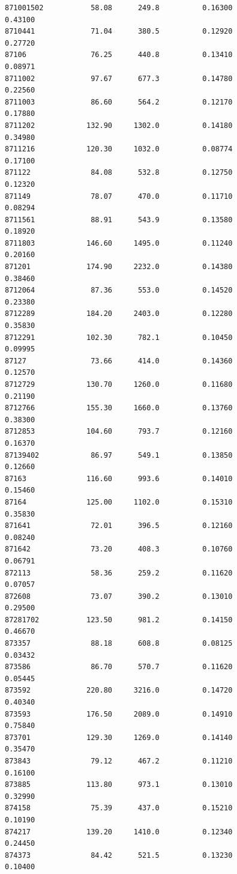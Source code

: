 \documentclass[
  letterpaper,
  DIV=11,
  numbers=noendperiod]{scrartcl}
\begin{document}
\begin{verbatim}
871001502           58.08      249.8          0.16300           0.43100
8710441             71.04      380.5          0.12920           0.27720
87106               76.25      440.8          0.13410           0.08971
8711002             97.67      677.3          0.14780           0.22560
8711003             86.60      564.2          0.12170           0.17880
8711202            132.90     1302.0          0.14180           0.34980
8711216            120.30     1032.0          0.08774           0.17100
871122              84.08      532.8          0.12750           0.12320
871149              78.07      470.0          0.11710           0.08294
8711561             88.91      543.9          0.13580           0.18920
8711803            146.60     1495.0          0.11240           0.20160
871201             174.90     2232.0          0.14380           0.38460
8712064             87.36      553.0          0.14520           0.23380
8712289            184.20     2403.0          0.12280           0.35830
8712291            102.30      782.1          0.10450           0.09995
87127               73.66      414.0          0.14360           0.12570
8712729            130.70     1260.0          0.11680           0.21190
8712766            155.30     1660.0          0.13760           0.38300
8712853            104.60      793.7          0.12160           0.16370
87139402            86.97      549.1          0.13850           0.12660
87163              116.60      993.6          0.14010           0.15460
87164              125.00     1102.0          0.15310           0.35830
871641              72.01      396.5          0.12160           0.08240
871642              73.20      408.3          0.10760           0.06791
872113              58.36      259.2          0.11620           0.07057
872608              73.07      390.2          0.13010           0.29500
87281702           123.50      981.2          0.14150           0.46670
873357              88.18      608.8          0.08125           0.03432
873586              86.70      570.7          0.11620           0.05445
873592             220.80     3216.0          0.14720           0.40340
873593             176.50     2089.0          0.14910           0.75840
873701             129.30     1269.0          0.14140           0.35470
873843              79.12      467.2          0.11210           0.16100
873885             113.80      973.1          0.13010           0.32990
874158              75.39      437.0          0.15210           0.10190
874217             139.20     1410.0          0.12340           0.24450
874373              84.42      521.5          0.13230           0.10400

\end{verbatim}
\end{document}

